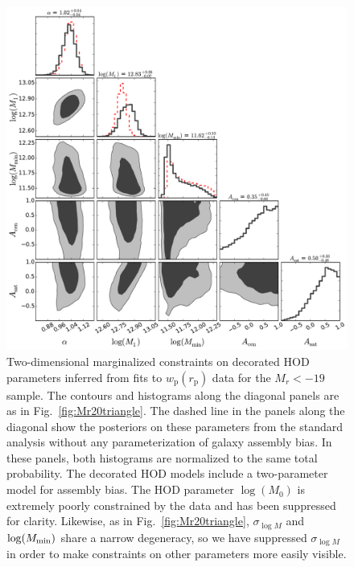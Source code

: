 \documentclass[usenatbib,usegraphicx,letterpaper]{mn2e}
\newcommand{\wprp}{w_{\mathrm{p}}}
\newcommand{\rp}{r_{\mathrm{p}}}
\begin{document}
\begin{figure}
\begin{center}
\includegraphics[width=15.0cm]{Mr19ABTri.pdf}
\caption{ Two-dimensional marginalized constraints on decorated HOD
  parameters inferred from fits to $\wprp(\rp)$ data for the $M_r<-19$
  sample. The contours and histograms along the diagonal panels are as
  in Fig.~\ref{fig:Mr20triangle}. The dashed line in the panels along the diagonal
  show the posteriors on these parameters from the standard analysis without
  any parameterization of galaxy assembly bias. In these panels, both histograms 
  are normalized to the same total probability. The decorated HOD models include a
  two-parameter model for assembly bias. The HOD parameter 
  $\log (M_0)$ is extremely poorly constrained by the data and has been
  suppressed for clarity. Likewise, as in Fig.~\ref{fig:Mr20triangle},
  $\sigma_{\log M}$ and $\log (M_{\rm min})$ share a narrow
  degeneracy, so we have suppressed $\sigma_{\log M}$ in order to make
  constraints on other parameters more easily visible.  }
\label{fig:Mr19ABtriangle}
\end{center}
\end{figure}
\end{document}
